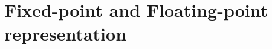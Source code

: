 %
%
%
%
%
%
%
%
%
%
%
%

%
%    
%
%
%    
%





\section{Fixed-point and Floating-point representation}

